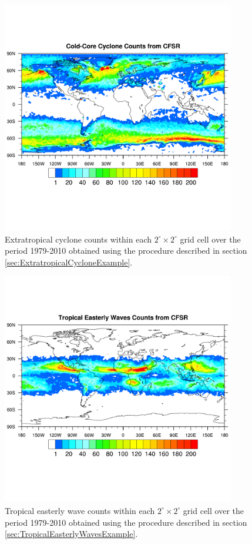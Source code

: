 \documentclass[gmdd, hvmath]{copernicus}
\begin{document}
\begin{figure}
\begin{center}
\includegraphics[width=4in, clip, trim=0.2cm 3.6cm 0.2cm 3.1cm]{plot-cfsr_etc_density.pdf}
\end{center}
\caption{Extratropical cyclone counts within each $2^\circ \times 2^\circ$ grid cell over the period 1979-2010 obtained using the procedure described in section \ref{sec:ExtratropicalCycloneExample}.} \label{fig:ExtratropicalCycloneDensity}
\end{figure}

\begin{figure}
\begin{center}
\includegraphics[width=4in, clip, trim=0.2cm 3.6cm 0.2cm 3.1cm]{plot-cfsr_tew_density.pdf}
\end{center}
\caption{Tropical easterly wave counts within each $2^\circ \times 2^\circ$ grid cell over the period 1979-2010 obtained using the procedure described in section \ref{sec:TropicalEasterlyWavesExample}.} \label{fig:TropicalEasterlyWaveDensity}
\end{figure}
\end{document}
